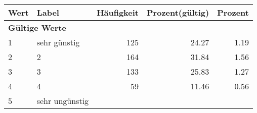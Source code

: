      \begin{longtable}{lXrrr}
     \toprule
     \textbf{Wert} & \textbf{Label} & \textbf{Häufigkeit} & \textbf{Prozent(gültig)} & \textbf{Prozent} \\
     \endhead
     \midrule
     \multicolumn{5}{l}{\textbf{Gültige Werte}}\\

     1 &
     \multicolumn{1}{X}{ sehr günstig   } &


       \num{125} &
       \num[round-mode=places,round-precision=2]{24.27} &
         \num[round-mode=places,round-precision=2]{1.19} \\

     2 &
     \multicolumn{1}{X}{ 2   } &


       \num{164} &
       \num[round-mode=places,round-precision=2]{31.84} &
         \num[round-mode=places,round-precision=2]{1.56} \\

     3 &
     \multicolumn{1}{X}{ 3   } &


       \num{133} &
       \num[round-mode=places,round-precision=2]{25.83} &
         \num[round-mode=places,round-precision=2]{1.27} \\

     4 &
     \multicolumn{1}{X}{ 4   } &


       \num{59} &
       \num[round-mode=places,round-precision=2]{11.46} &
         \num[round-mode=places,round-precision=2]{0.56} \\

     5 &
     \multicolumn{1}{X}{ sehr ungünstig   } &



\end{longtable}
